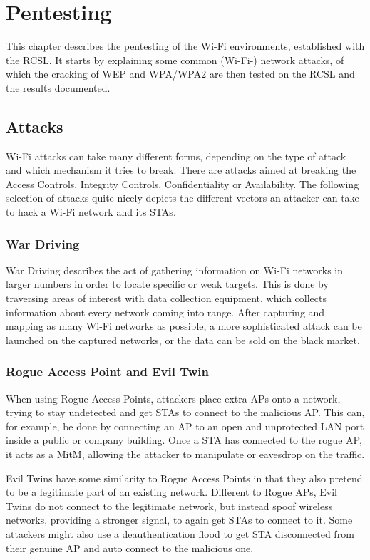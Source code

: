 \chapter{Pentesting}\label{ch:testing}
\lstset{style=inline}

This chapter describes the pentesting of the Wi-Fi environments, established with the RCSL.
It starts by explaining some common (Wi-Fi-) network attacks, of which the cracking of WEP and WPA/WPA2 are then tested on the RCSL and the results documented.

\section{Attacks}
Wi-Fi attacks can take many different forms, depending on the type of attack and which mechanism it tries to break.
There are attacks aimed at breaking the Access Controls, Integrity Controls, Confidentiality or Availability. \cite{Oriyano_2017}
The following selection of attacks quite nicely depicts the different vectors an attacker can take to hack a Wi-Fi network and its STAs.

\subsection{War Driving}
War Driving describes the act of gathering information on Wi-Fi networks in larger numbers in order to locate specific or weak targets.
This is done by traversing areas of interest with data collection equipment, which collects information about every network coming into range.
After capturing and mapping as many Wi-Fi networks as possible, a more sophisticated attack can be launched on the captured networks, or the data can be sold on the black market. \cite{Oriyano_2017}

\subsection{Rogue Access Point and Evil Twin}
When using Rogue Access Points, attackers place extra APs onto a network, trying to stay undetected and get STAs to connect to the malicious AP.
This can, for example, be done by connecting an AP to an open and unprotected LAN port inside a public or company building.
Once a STA has connected to the rogue AP, it acts as a MitM, allowing the attacker to manipulate or eavesdrop on the traffic.

Evil Twins have some similarity to Rogue Access Points in that they also pretend to be a legitimate part of an existing network.
Different to Rogue APs, Evil Twins do not connect to the legitimate network, but instead spoof wireless networks, providing a stronger signal, to again get STAs to connect to it.
Some attackers might also use a deauthentication flood to get STA disconnected from their genuine AP and auto connect to the malicious one.

